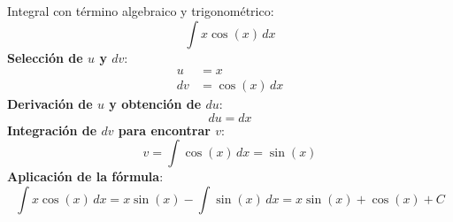\begin{example}
Integral con término algebraico y trigonométrico:    
\begin{equation*}
    \int x \cos(x) \, dx 
\end{equation*}
    \textbf{Selección de \( u \) y \( dv \)}:
    \begin{align*}
    u &= x \\
    dv &= \cos(x) \, dx
    \end{align*}
    \textbf{Derivación de \( u \) y obtención de \( du \)}:
\begin{equation*}
    du = dx
\end{equation*}
    \textbf{Integración de \( dv \) para encontrar \( v \)}:
\begin{equation*}
    v = \int \cos(x) \, dx = \sin(x)
\end{equation*}
    \textbf{Aplicación de la fórmula}:
\begin{equation*}
    \int x \cos(x) \, dx = x \sin(x) - \int \sin(x) \, dx = x \sin(x) + \cos(x) + C
\end{equation*}
\end{example}

